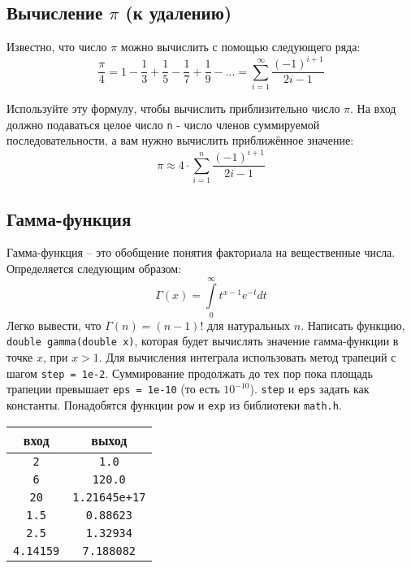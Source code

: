 \documentclass{article}
\begin{document}
\subsection{Вычисление $\pi$ (к удалению)} 
Известно, что число $\pi$ можно вычислить с помощью следующего ряда:
$$
\frac{\pi}{4} = 1 - \frac{1}{3} + \frac{1}{5} - \frac{1}{7} + \frac{1}{9} - ... = \sum_{i=1}^{\infty} \frac{(-1)^{i + 1}}{2i-1}
$$

Используйте эту формулу, чтобы вычислить приблизительно число $\pi$. На вход должно подаваться целое число \texttt{n} - число членов суммируемой последовательности, а вам нужно вычислить приближённое значение:
$$
\pi \approx 4 \cdot \sum_{i=1}^{n} \frac{(-1)^{i + 1}}{2i-1}
$$



\subsection{Гамма-функция} 
Гамма-функция -- это обобщение понятия факториала на вещественные числа. Определяется следующим образом:
$$
\Gamma \left( x \right) = \int\limits_0^\infty {t^{x - 1} e^{ - t} dt}
$$
Легко вывести, что $\Gamma(n) = (n - 1)!$ для натуральных $n$. Написать функцию, \texttt{double gamma(double x)}, которая будет вычислять значение гамма-функции в точке $x$, при $x > 1$. Для вычисления интеграла использовать метод трапеций с шагом \texttt{step = 1e-2}. Суммирование продолжать до тех пор пока площадь трапеции превышает \texttt{eps = 1e-10} (то есть $10 ^{-10}$). \texttt{step} и \texttt{eps} задать как константы. Понадобятся функции \texttt{pow} и \texttt{exp} из библиотеки \texttt{math.h}.

\begin{center}
\begin{tabular}{ c c }
 вход & выход \\ \hline
 \texttt{2} & \texttt{1.0}  \\ 
 \texttt{6} & \texttt{120.0}  \\
 \texttt{20} & \texttt{1.21645e+17}  \\
 \texttt{1.5} &        \texttt{0.88623} \\
 \texttt{2.5} &        \texttt{1.32934}\\
 \texttt{4.14159} & \texttt{7.188082}\\
\end{tabular}
\end{center}
\end{document}
